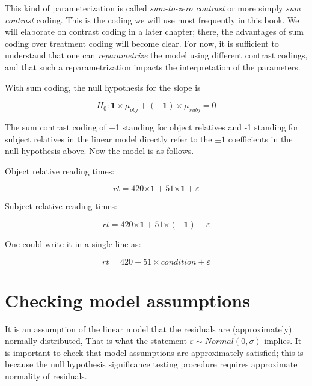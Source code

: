 \documentclass[12pt,]{krantz}
\begin{document}
This kind of parameterization is called \emph{sum-to-zero contrast} or more simply \emph{sum contrast} coding. This is the coding we will use most frequently in this book. We will elaborate on contrast coding in a later chapter; there, the advantages of sum coding over treatment coding will become clear. For now, it is sufficient to understand that one can \emph{reparametrize} the model using different contrast codings, and that such a reparametrization impacts the interpretation of the parameters.

With sum coding, the null hypothesis for the slope is

\begin{equation}
H_0: \mathbf{1\times} \mu_{obj} + (\mathbf{-1}) \times\mu_{subj} = 0   
\end{equation}

The sum contrast coding of +1 standing for object relatives and -1 standing for subject relatives in the linear model directly refer to the \(\pm 1\) coefficients in the null hypothesis above.
Now the model is as follows.

Object relative reading times:

\begin{equation}
rt = 420\mathbf{\times 1} + 51\mathbf{\times 1} + \varepsilon
\end{equation}

Subject relative reading times:

\begin{equation}
rt = 420\mathbf{\times 1} + 51\mathbf{\times (-1)} + \varepsilon
\end{equation}

One could write it in a single line as:

\begin{equation}
rt = 420 + 51\times condition + \varepsilon
\end{equation}

\hypertarget{checking-model-assumptions}{%
\section{Checking model assumptions}\label{checking-model-assumptions}}

It is an assumption of the linear model that the residuals are (approximately) normally distributed, That is what the statement \(\varepsilon\sim Normal(0,\sigma)\) implies. It is important to check that model assumptions are approximately satisfied; this is because the null hypothesis significance testing procedure requires approximate normality of residuals.
\end{document}
